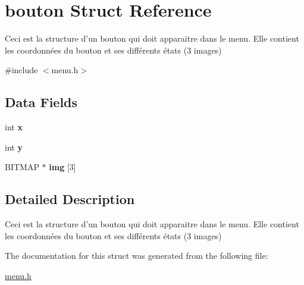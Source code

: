 \hypertarget{structbouton}{\section{bouton Struct Reference}
\label{structbouton}
}


Ceci est la structure d'un bouton qui doit apparaitre dans le menu. Elle contient les coordonnées du bouton et ses différents états (3 images)  




{\ttfamily \#include $<$menu.\-h$>$}

\subsection*{Data Fields}
\begin{DoxyCompactItemize}
\item 
\hypertarget{structbouton_a6150e0515f7202e2fb518f7206ed97dc}{int {\bfseries x}}\label{structbouton_a6150e0515f7202e2fb518f7206ed97dc}

\item 
\hypertarget{structbouton_a0a2f84ed7838f07779ae24c5a9086d33}{int {\bfseries y}}\label{structbouton_a0a2f84ed7838f07779ae24c5a9086d33}

\item 
\hypertarget{structbouton_a99933deee119efe612d38cf6759af35e}{B\-I\-T\-M\-A\-P $\ast$ {\bfseries img} \mbox{[}3\mbox{]}}\label{structbouton_a99933deee119efe612d38cf6759af35e}

\end{DoxyCompactItemize}


\subsection{Detailed Description}
Ceci est la structure d'un bouton qui doit apparaitre dans le menu. Elle contient les coordonnées du bouton et ses différents états (3 images) 


\begin{DoxyItemize}
\item 
\end{DoxyItemize}

The documentation for this struct was generated from the following file\-:\begin{DoxyCompactItemize}
\item 
\hyperlink{menu_8h}{menu.\-h}\end{DoxyCompactItemize}
